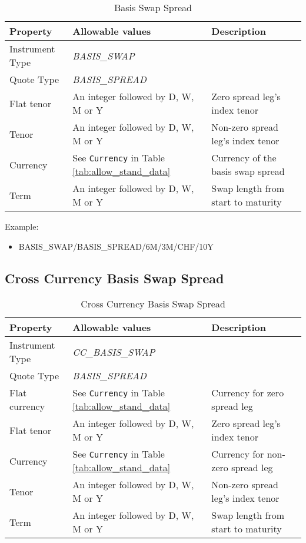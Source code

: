 \begin{table}[H]
\centering
  \begin{tabular}{|p{3cm}|p{3.5cm}|p{7cm}|}
    \hline
    {\bf Property} & {\bf Allowable values} & {\bf Description} \\ \hline
    Instrument Type & \emph{BASIS\_SWAP} & \\ \hline
    Quote Type & \emph{BASIS\_SPREAD} & \\ \hline
    Flat tenor & An integer followed by D, W, M or Y & Zero spread leg's index tenor\\ \hline
    Tenor & An integer followed by D, W, M or Y & Non-zero spread leg's index tenor\\ \hline
    Currency & See \lstinline!Currency! in Table \ref{tab:allow_stand_data}& Currency of the basis swap spread\\ \hline
    Term & An integer followed by D, W, M or Y & Swap length from start to maturity\\ \hline
  \end{tabular}
  \caption{Basis Swap Spread}
  \label{tab:basisspread_quote}
\end{table}


\medskip
Example:
\begin{itemize}
\item {BASIS\_SWAP/BASIS\_SPREAD/6M/3M/CHF/10Y}
\end{itemize}

\subsection{Cross Currency Basis Swap Spread}

\begin{table}[H]
\centering
  \begin{tabular}{|p{3cm}|p{3.5cm}|p{7cm}|}
    \hline
    {\bf Property} & {\bf Allowable values} & {\bf Description} \\ \hline
    Instrument Type & \emph{CC\_BASIS\_SWAP} & \\ \hline
    Quote Type & \emph{BASIS\_SPREAD} & \\ \hline
    Flat currency & See \lstinline!Currency! in Table \ref{tab:allow_stand_data} & Currency for zero spread leg\\  \hline
    Flat tenor & An integer followed by D, W, M or Y & Zero spread leg's index tenor\\ \hline
    Currency & See \lstinline!Currency! in Table \ref{tab:allow_stand_data}& Currency for non-zero spread leg\\ \hline
    Tenor & An integer followed by D, W, M or Y & Non-zero spread leg's index tenor\\ \hline
    Term & An integer followed by D, W, M or Y & Swap length from start to maturity\\ \hline
  \end{tabular}
  \caption{Cross Currency Basis Swap Spread}
  \label{tab:ccbasisspread_quote}
\end{table}


